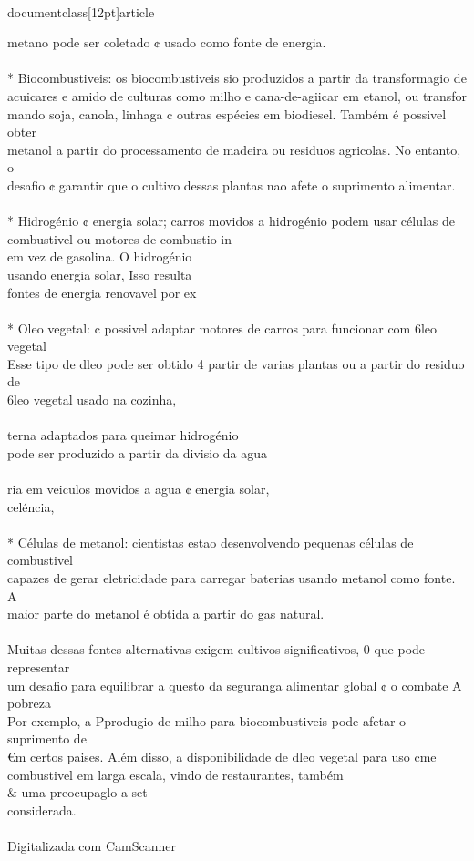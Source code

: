 \\documentclass[12pt]{article}
\begin{document}
{{{{{{metano pode ser coletado ¢ usado como fonte de energia.\\
\\
* Biocombustiveis: os biocombustiveis sio produzidos a partir da transformagio de\\
acuicares e amido de culturas como milho e cana-de-agiicar em etanol, ou transfor\\
mando soja, canola, linhaga ¢ outras espécies em biodiesel. Também é possivel obter\\
metanol a partir do processamento de madeira ou residuos agricolas. No entanto, o\\
desafio ¢ garantir que o cultivo dessas plantas nao afete o suprimento alimentar.\\
\\
* Hidrogénio ¢ energia solar; carros movidos a hidrogénio podem usar células de\\
combustivel ou motores de combustio in\\
em vez de gasolina. O hidrogénio\\
usando energia solar, Isso resulta\\
fontes de energia renovavel por ex\\
\\
* Oleo vegetal: ¢ possivel adaptar motores de carros para funcionar com 6leo vegetal\\
Esse tipo de dleo pode ser obtido 4 partir de varias plantas ou a partir do residuo de\\
6leo vegetal usado na cozinha,\\
\\
terna adaptados para queimar hidrogénio\\
pode ser produzido a partir da divisio da agua\\
\\
ria em veiculos movidos a agua ¢ energia solar,\\
celéncia,\\
\\
* Células de metanol: cientistas estao desenvolvendo pequenas células de combustivel\\
capazes de gerar eletricidade para carregar baterias usando metanol como fonte. A\\
maior parte do metanol é obtida a partir do gas natural.\\
\\
Muitas dessas fontes alternativas exigem cultivos significativos, 0 que pode representar\\
um desafio para equilibrar a questo da seguranga alimentar global ¢ o combate A pobreza\\
Por exemplo, a Pprodugio de milho para biocombustiveis pode afetar o suprimento de\\
€m certos paises. Além disso, a disponibilidade de dleo vegetal para uso cme\\
combustivel em larga escala, vindo de restaurantes, também \\& uma preocupaglo a set\\
considerada.\\
\\
Digitalizada com CamScanner\\

}}}}}}
\end{document}
